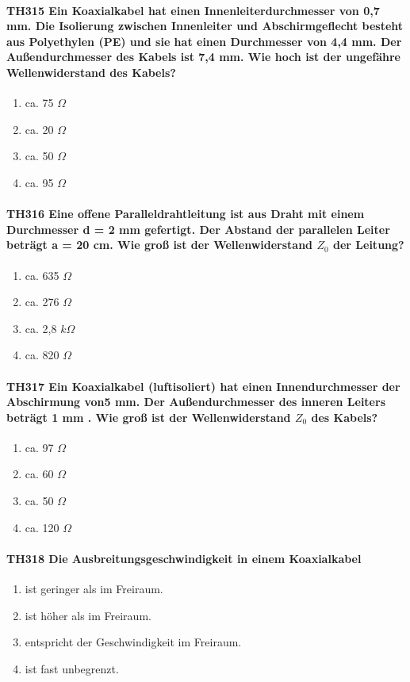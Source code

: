 \documentclass[8pt]{article}
\begin{document}
\paragraph*{TH315 Ein Koaxialkabel hat einen Innenleiterdurchmesser von 0,7 mm. Die Isolierung
zwischen Innenleiter und Abschirmgeflecht besteht aus Polyethylen (PE) und sie hat einen Durchmesser von 4,4 mm. Der Außendurchmesser des Kabels ist 7,4 mm. Wie hoch ist der ungefähre Wellenwiderstand des Kabels?}
\begin{enumerate}[nolistsep,label=\Alph*]
\item ca. 75 $\Omega$
\item ca. 20 $\Omega$
\item ca. 50 $\Omega$
\item ca. 95 $\Omega$
\end{enumerate}

\paragraph*{TH316 Eine offene Paralleldrahtleitung ist aus Draht mit einem Durchmesser d = 2 mm gefertigt. Der Abstand der parallelen Leiter beträgt a = 20 cm. Wie groß ist der Wellenwiderstand $Z_{0}$ der Leitung?}
\begin{enumerate}[nolistsep,label=\Alph*]
\item ca. 635 $\Omega$
\item ca. 276 $\Omega$
\item ca. 2,8 $k\Omega$
\item ca. 820 $\Omega$
\end{enumerate}

\paragraph*{TH317 Ein Koaxialkabel (luftisoliert) hat einen Innendurchmesser der Abschirmung von5 mm. Der Außendurchmesser des inneren Leiters beträgt 1 mm . Wie groß ist der Wellenwiderstand $Z_{0}$ des Kabels?}
\begin{enumerate}[nolistsep,label=\Alph*]
\item ca. 97 $\Omega$
\item ca. 60 $\Omega$
\item ca. 50 $\Omega$
\item ca. 120 $\Omega$
\end{enumerate}

\paragraph*{TH318 Die Ausbreitungsgeschwindigkeit in einem Koaxialkabel}
\begin{enumerate}[nolistsep,label=\Alph*]
\item ist geringer als im Freiraum.
\item ist höher als im Freiraum.
\item entspricht der Geschwindigkeit im Freiraum.
\item ist fast unbegrenzt.
\end{enumerate}
\end{document}
